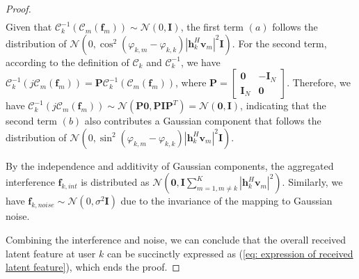 \documentclass[10pt,a4paper]{amsart}
\def\phi{\varphi}
\begin{document}
\begin{proof}
\begin{align}
   \end{align}
   Given that $\mathcal{C}_k^{-1}(\mathcal{C}_m(\mathbf{f}_m))\sim\mathcal{N}(0,\mathbf{I})$, the first term $(a)$ follows the distribution of $\mathcal{N}(0,\cos^2(\phi_{k,m}-\phi_{k,k})|\mathbf{h}_k^H\mathbf{v}_m|^2\mathbf{I})$. For the second term, according to the definition of $\mathcal{C}_k$ and $\mathcal{C}_k^{-1}$, we have $\mathcal{C}_k^{-1}(j\mathcal{C}_m(\mathbf{f}_m))=\mathbf{P}\mathcal{C}_k^{-1}(\mathcal{C}_m(\mathbf{f}_m))$, 
   where $\mathbf{P}=\begin{bmatrix} \mathbf{0}&-\mathbf{I}_{N}\\\mathbf{I}_N&\mathbf{0} \end{bmatrix}$. 
   Therefore, we have $\mathcal{C}_k^{-1}(j\mathcal{C}_m(\mathbf{f}_m))\sim \mathcal{N}(\mathbf{P}\mathbf{0},\mathbf{P}\mathbf{I}\mathbf{P}^T)=\mathcal{N}(\mathbf{0},\mathbf{I})$, indicating that the second term $(b)$ also contributes a Gaussian component  that follows the distribution of $\mathcal{N}(0,\sin^2(\phi_{k,m}-\phi_{k,k})|\mathbf{h}_k^H\mathbf{v}_m|^2\mathbf{I})$. 
   
   By the independence and additivity of Gaussian components, the aggregated interference $\mathbf{f}_{k,int}$ is distributed as $\mathcal{N}(\mathbf{0},\mathbf{I}\sum_{m=1,m\neq k}^K|\mathbf{h}_k^H\mathbf{v}_m|^2)$. 
   Similarly, we have $\mathbf{f}_{k,noise}\sim \mathcal{N}(0,\sigma^2\mathbf{I})$ due to the invariance of the mapping to Gaussian noise. 
   
   Combining the interference and noise, we can conclude that the overall received latent feature at user $k$ can be succinctly expressed as (\ref{eq: expression of received latent feature}), which ends the proof. %
\end{proof}
\end{document}
